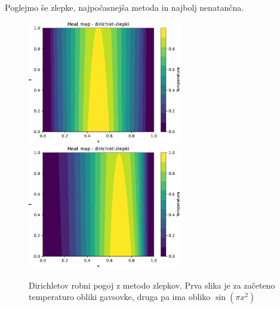 \newpage
Poglejmo še zlepke, najpočasnejša metoda in najbolj nenatančna.
\begin{figure}[h]
    \centering
    \includegraphics[width=0.6\textwidth]{pdfs/zlepki.pdf}
    \includegraphics[width=0.6\textwidth]{pdfs/zlepki2.pdf}
    \caption{Dirichletov robni pogoj z metodo zlepkov. 
    Prva slika je za začeteno temperaturo obliki gavsovke, druga pa ima obliko $\sin(\pi x^2)$}
\end{figure}
\newpage
